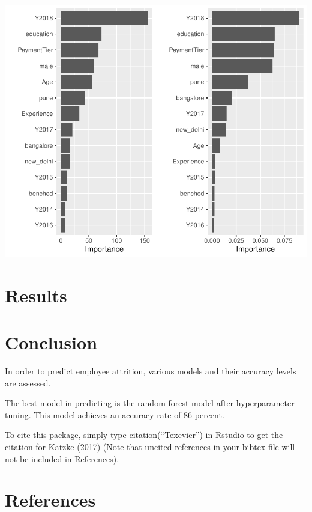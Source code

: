 \documentclass[11pt,preprint, authoryear]{elsarticle}
\numberwithin{equation}{section}
\numberwithin{figure}{section}
\numberwithin{table}{section}
\begin{document}
\includegraphics{Final_project_files/figure-latex/unnamed-chunk-14-1.pdf}

\hypertarget{results}{%
\section{Results}\label{results}}

\hfill

\hypertarget{conclusion}{%
\section{Conclusion}\label{conclusion}}

In order to predict employee attrition, various models and their
accuracy levels are assessed.

The best model in predicting is the random forest model after
hyperparameter tuning. This model achieves an accuracy rate of 86
percent.

To cite this package, simply type citation(``Texevier'') in Rstudio to
get the citation for Katzke (\protect\hyperlink{ref-Texevier}{2017})
(Note that uncited references in your bibtex file will not be included
in References).

\newpage

\hypertarget{references}{%
\section*{References}\label{references}}
\end{document}
